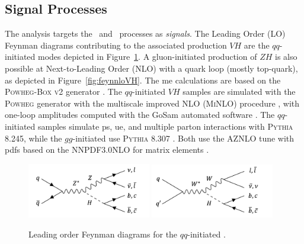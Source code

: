 \subsection{Signal Processes}
The analysis targets the \vhb\ and \vhc\ processes as \textit{signals}. The Leading Order (LO) Feynman diagrams contributing to the associated production $VH$ are the $qq$-initiated modes depicted in Figure~\ref{fig:feynloVH}. A gluon-initiated production of $ZH$ is also possible at Next-to-Leading Order (NLO) with a quark loop (mostly top-quark), as depicted in Figure~\ref{fig:feynnloVH}. The \gls{me} calculations are based on the \textsc{Powheg-Box v2} generator \cite{StefanoFrixione_20072, POWHEGBOX}. The $qq$-initiated $VH$ samples are simulated with the \textsc{Powheg} generator with the multiscale improved NLO (\textsc{MiNLO}) procedure \cite{powhegHW}, with one-loop amplitudes computed with the GoSam automated software \cite{gosam}. The $qq$-initiated samples simulate \gls{ps}, \gls{ue}, and multiple parton interactions with \textsc{Pythia} 8.245, while the $gg$-initiated use \textsc{Pythia} 8.307 \cite{SJOSTRAND2015159}. Both use the AZNLO tune \cite{measureZGboson} with \glspl{pdf} based on the \textsc{NNPDF3.0NLO} for matrix elements \cite{PDFLHCrun2}. \\

\begin{figure}[h!]
  \center
  \includegraphics[width=0.48\textwidth]{Images/VH/Feynman/zh.png}
  \includegraphics[width=0.48\textwidth]{Images/VH/Feynman/wh.png}
  \caption{Leading order Feynman diagrams for the $qq$-initiated \vhbc.} 
  \label{fig:feynloVH}
\end{figure}

